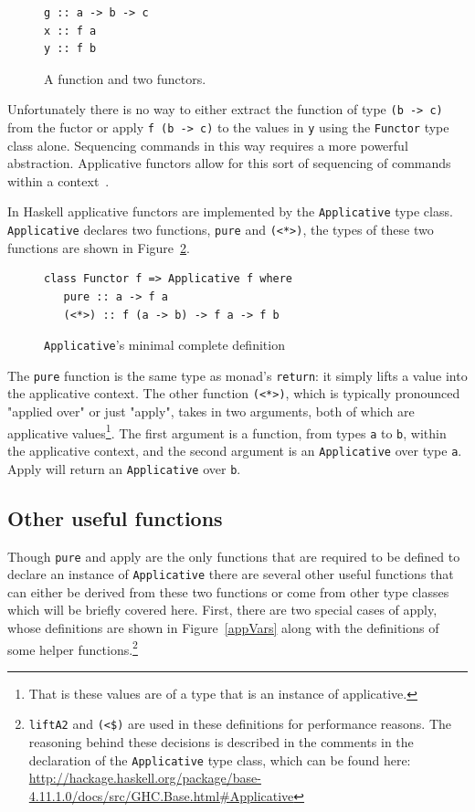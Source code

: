 \begin{figure}[t]
\begin{lstlisting}
g :: a -> b -> c
x :: f a
y :: f b
\end{lstlisting}
\caption{A function and two functors.}
\label{gxy}
\end{figure}

Unfortunately there is no way to either extract the function of type \texttt{(b -> c)} from the fuctor or apply \texttt{f (b -> c)} to the values in \texttt{y} using the \texttt{Functor} type class alone. Sequencing commands in this way requires a more powerful abstraction. Applicative functors allow for this sort of sequencing of commands within a context~\citep{realWorldHaskell}. 

In Haskell applicative functors are implemented by the \texttt{Applicative} type class. \texttt{Applicative} declares two functions, \texttt{pure} and \texttt{(<*>)}, the types of these two functions are shown in Figure~\ref{appTypes}. 

\begin{figure}[t]
\begin{lstlisting}
class Functor f => Applicative f where
   pure :: a -> f a
   (<*>) :: f (a -> b) -> f a -> f b
\end{lstlisting}
\caption{\texttt{Applicative}'s minimal complete definition}
\label{appTypes}
\end{figure}

The \texttt{pure} function is the same type as monad's \texttt{return}: it simply lifts a value into the applicative context. The other function \texttt{(<*>)}, which is typically pronounced "applied over" or just "apply", takes in two arguments, both of which are applicative values\footnote{That is these values are of a type that is an instance of applicative.}. The first argument is a function, from types \texttt{a} to \texttt{b}, within the applicative context, and the second argument is an \texttt{Applicative} over type \texttt{a}. Apply will return an \texttt{Applicative} over \texttt{b}.

\subsection{Other useful functions}
\label{sec:useful}
Though \texttt{pure} and apply are the only functions that are required to be defined to declare an instance of \texttt{Applicative} there are several other useful functions that can either be derived from these two functions or come from other type classes which will be briefly covered here. First, there are two special cases of apply, whose definitions are shown in Figure~\ref{appVars} along with the definitions of some helper functions.\footnote{\texttt{liftA2} and \texttt{(<\$)} are used in these definitions for performance reasons. The reasoning behind these decisions is described in the comments in the declaration of the \texttt{Applicative} type class, which can be found here: \url{http://hackage.haskell.org/package/base-4.11.1.0/docs/src/GHC.Base.html\#Applicative}}

